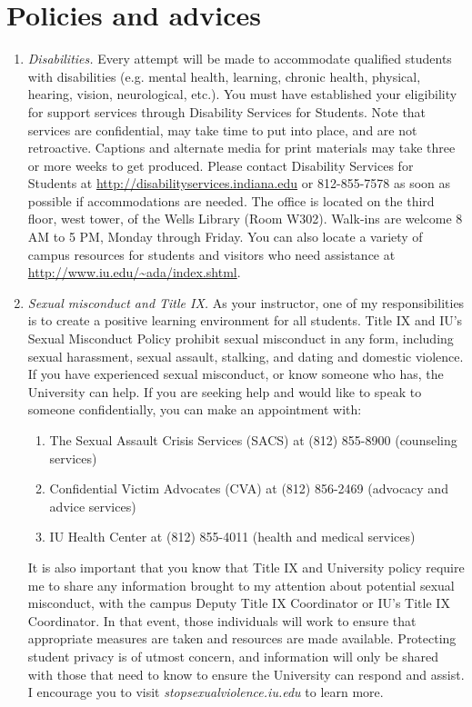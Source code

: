 \documentclass[11pt,article,oneside]{memoir} %
\begin{document}
\section{Policies and advices} %

\begin{enumerate}

\item \emph{Disabilities.} Every attempt will be made to accommodate qualified
students with disabilities (e.g. mental health, learning, chronic health,
physical, hearing, vision, neurological, etc.). You must have established your
eligibility for support services through Disability Services for Students. Note
that services are confidential, may take time to put into place, and are not
retroactive.  Captions and alternate media for print materials may take three
or more weeks to get produced. Please contact Disability Services for Students
at \url{http://disabilityservices.indiana.edu} or 812-855-7578 as soon as
possible if accommodations are needed. The office is located on the third
floor, west tower, of the Wells Library (Room W302). Walk-ins are welcome 8 AM
to 5 PM, Monday through Friday. You can also locate a variety of campus
resources for students and visitors who need assistance at
\url{http://www.iu.edu/~ada/index.shtml}.

\item \emph{Sexual misconduct and Title IX.} As your instructor, one of my
responsibilities is to create a positive learning environment for all students.
Title IX and IU's Sexual Misconduct Policy prohibit sexual misconduct in any
form, including sexual harassment, sexual assault, stalking, and dating and
domestic violence.  If you have experienced sexual misconduct, or know someone
who has, the University can help. If you are seeking help and would like to
speak to someone confidentially, you can make an appointment with:

\begin{enumerate}

\item The Sexual Assault Crisis Services (SACS) at (812) 855-8900 (counseling services)
\item Confidential Victim Advocates (CVA) at (812) 856-2469 (advocacy and advice services)
\item IU Health Center at (812) 855-4011 (health and medical services)

\end{enumerate}

It is also important that you know that Title IX and University policy require
me to share any information brought to my attention about potential sexual
misconduct, with the campus Deputy Title IX Coordinator or IU's Title IX
Coordinator. In that event, those individuals will work to ensure that
appropriate measures are taken and resources are made available. Protecting
student privacy is of utmost concern, and information will only be shared with
those that need to know to ensure the University can respond and assist. I
encourage you to visit \emph{stopsexualviolence.iu.edu} to learn more.


\end{enumerate}
\end{document}
